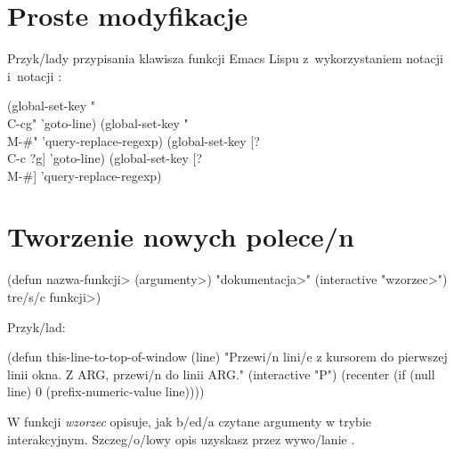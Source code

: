 \section{Proste modyfikacje}



Przyk/lady przypisania klawisza funkcji Emacs Lispu\newline
z~wykorzystaniem notacji  i~notacji \kbd{[...]}:

\beginexample%
(global-set-key "\\C-cg" 'goto-line)
(global-set-key "\\M-\#" 'query-replace-regexp)
\smallskip
(global-set-key [?\\C-c ?g] 'goto-line)
(global-set-key [?\\M-\#] 'query-replace-regexp)
\endexample

\section{Tworzenie nowych polece/n}

\beginexample%
(defun \<nazwa-funkcji> (\<argumenty>)
  "\<dokumentacja>"
  (interactive "\<wzorzec>")
  \<tre/s/c funkcji>)
\endexample

Przyk/lad:

\beginexample%
(defun this-line-to-top-of-window (line)
  "Przewi/n lini/e z kursorem do pierwszej linii okna.
Z ARG, przewi/n do linii ARG."
  (interactive "P")
  (recenter (if (null line)
                0
              (prefix-numeric-value line))))
\endexample

W funkcji  {\it wzorzec\/} opisuje, jak b/ed/a czytane
argumenty w trybie interakcyjnym. Szczeg/o/lowy opis uzyskasz
przez wywo/lanie .

\copyrightnotice

\bye
